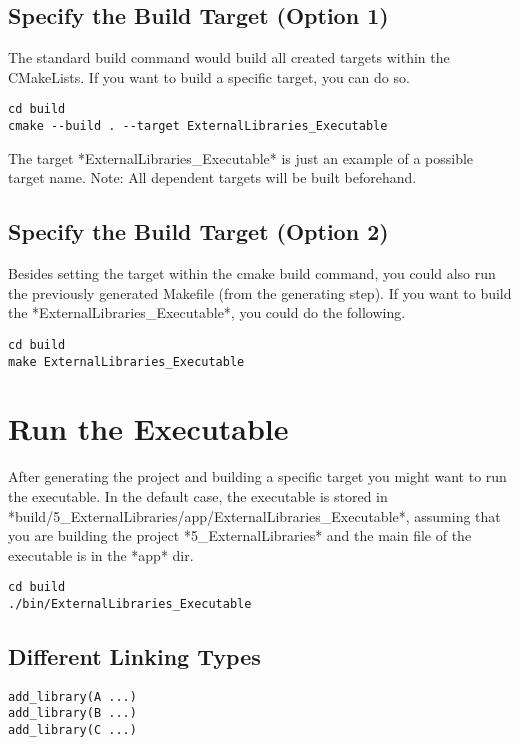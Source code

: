 \subsection{Specify the Build Target (Option 1)}


The standard build command would build all created targets within the CMakeLists.
If you want to build a specific target, you can do so.

\begin{verbatim}
cd build
cmake --build . --target ExternalLibraries_Executable
\end{verbatim}

The target *ExternalLibraries\_Executable* is just an example of a possible target name.
Note: All dependent targets will be built beforehand.

\subsection{Specify the Build Target (Option 2)}


Besides setting the target within the cmake build command, you could also run the previously generated Makefile (from the generating step).
If you want to build the *ExternalLibraries\_Executable*, you could do the following.

\begin{verbatim}
cd build
make ExternalLibraries_Executable
\end{verbatim}


\section{Run the Executable}

After generating the project and building a specific target you might want to run the executable.
In the default case, the executable is stored in *build/5\_ExternalLibraries/app/ExternalLibraries\_Executable*, assuming that you are building the project *5_ExternalLibraries* and the main file of the executable is in the *app* dir.

\begin{verbatim}
cd build
./bin/ExternalLibraries_Executable
\end{verbatim}


\subsection{Different Linking Types}

\begin{verbatim}
add_library(A ...)
add_library(B ...)
add_library(C ...)
\end{verbatim}

